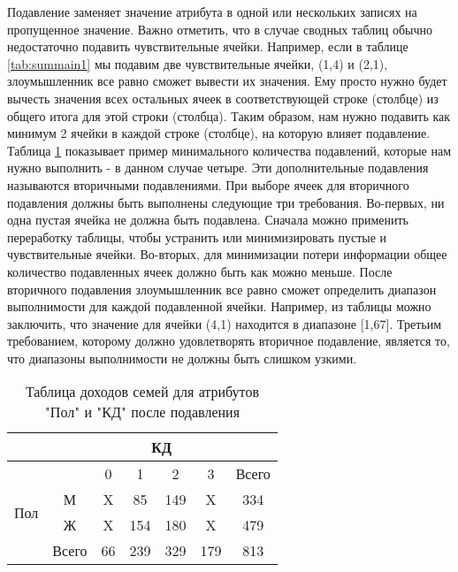Подавление заменяет значение атрибута в одной или нескольких записях на пропущенное значение. Важно отметить, что в случае сводных таблиц обычно недостаточно подавить чувствительные ячейки. Например, если в таблице \ref{tab:summain1} мы подавим две чувствительные ячейки, (1,4) и (2,1), злоумышленник все равно сможет вывести их значения. Ему просто нужно будет вычесть значения всех остальных ячеек в соответствующей строке (столбце) из общего итога для этой строки (столбца). Таким образом, нам нужно подавить как минимум 2 ячейки в каждой строке (столбце), на которую влияет подавление. Таблица \ref{tab:suppression} показывает пример минимального количества подавлений, которые нам нужно выполнить - в данном случае четыре. Эти дополнительные подавления называются вторичными подавлениями. При выборе ячеек для вторичного подавления должны быть выполнены следующие три требования. Во-первых, ни одна пустая ячейка не должна быть подавлена. Сначала можно применить переработку таблицы, чтобы устранить или минимизировать пустые и чувствительные ячейки. Во-вторых, для минимизации потери информации общее количество подавленных ячеек должно быть как можно меньше. После вторичного подавления злоумышленник все равно сможет определить диапазон выполнимости для каждой подавленной ячейки. Например, из таблицы  можно заключить, что значение для ячейки (4,1) находится в диапазоне [1,67]. Третьим требованием, которому должно удовлетворять вторичное подавление, является то, что диапазоны выполнимости не должны быть слишком узкими.
\\

\begin{table}[h]
\centering
\begin{tabular}{|c|cccccc|}
\hline
                        & \multicolumn{6}{c|}{КД}                                                                                                         \\ \hline
\multirow{4}{*}{Пол} & \multicolumn{1}{c|}{}      & \multicolumn{1}{c|}{0}  & \multicolumn{1}{c|}{1}   & \multicolumn{1}{c|}{2}   & \multicolumn{1}{c|}{3}   & Всего \\ \cline{2-7} 
                        & \multicolumn{1}{c|}{М}     & \multicolumn{1}{c|}{X} & \multicolumn{1}{c|}{85}  & \multicolumn{1}{c|}{149} & \multicolumn{1}{c|}{X}  & 334   \\ \cline{2-7} 
                        & \multicolumn{1}{c|}{Ж}     & \multicolumn{1}{c|}{X} & \multicolumn{1}{c|}{154} & \multicolumn{1}{c|}{180} & \multicolumn{1}{c|}{X} & 479   \\ \cline{2-7} 
                        & \multicolumn{1}{c|}{Всего} & \multicolumn{1}{c|}{66} & \multicolumn{1}{c|}{239} & \multicolumn{1}{c|}{329} & \multicolumn{1}{c|}{179} & 813   \\ \hline
\end{tabular}
\caption{Таблица доходов семей для атрибутов "Пол" и "КД" после подавления}
\label{tab:suppression}
\end{table}

